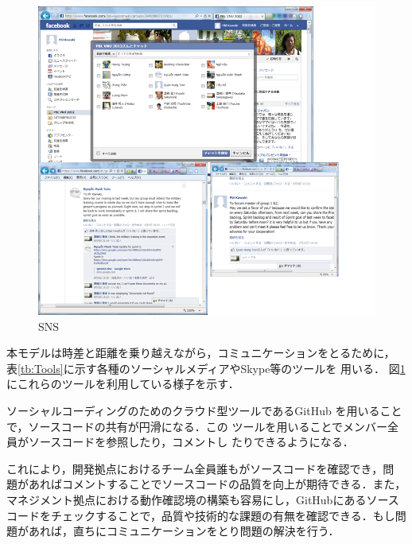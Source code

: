 \documentclass[a4j, 12Q, twocolumn, twoside]{jsarticle}
\begin{document}
\begin{figure}[htb]
  \begin{center}
   \includegraphics[width=\columnwidth]{./figures/SNS.png}
   \caption{SNS}
   \label{fig:SNS}
  \end{center}
\end{figure}


本モデルは時差と距離を乗り越えながら，コミュニケーションをとるために，
表\ref{tb:Tools}に示す各種のソーシャルメディアやSkype等のツールを
用いる．
図\ref{fig:SNS}
にこれらのツールを利用している様子を示す．

ソーシャルコーディングのためのクラウド型ツールであるGitHub
を用いることで，ソースコードの共有が円滑になる．この
ツールを用いることでメンバー全員がソースコードを参照したり，コメントし
たりできるようになる．

これにより，開発拠点におけるチーム全員誰もがソースコードを確認でき，問
題があればコメントすることでソースコードの品質を向上が期待できる．また，
マネジメント拠点における動作確認境の構築も容易にし，GitHubにあるソース
コードをチェックすることで，品質や技術的な課題の有無を確認できる．もし問
題があれば，直ちにコミュニケーションをとり問題の解決を行う．
\end{document}
